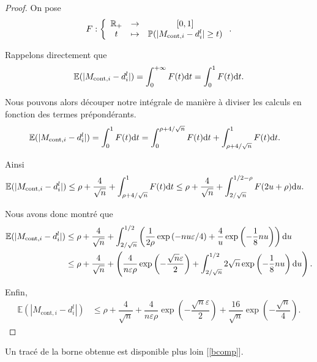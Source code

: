 \begin{proof}
    On pose 
    \[
        F : \left\{
            \begin{array}[]{ccc}
                \R_+ & \to & [0,1]\\
                t & \mapsto & \mathbb P(|M_{\text{cont}, i} - d_i^l| \geq t)
            \end{array}
        \right.   .
    \]

    Rappelons directement que
    \[
            \mathbb E(|M_{\text{cont}, i} - d_i^l|) = \int_0^{+\infty} F(t) \mathrm{d} t = \int_0^1 F(t) \mathrm{d} t.
    \]

    Nous pouvons alors découper notre intégrale de manière à diviser les calculs en fonction des termes prépondérants. 
    \begin{align*}
        \mathbb E(|M_{\text{cont}, i} - d_i^l|) & = \int_0^1 F(t) \mathrm{d} t = \int_0^{\rho + 4/\sqrt n} F(t) \mathrm{d} t + \int_{\rho + 4/\sqrt n}^1 F(t) \mathrm{d} t.
    \end{align*}

    Ainsi
    \begin{align*}
        \mathbb E(|M_{\text{cont}, i} - d_i^l|) & \leq \rho + \dfrac{4}{\sqrt n}  + \int_{\rho + 4/\sqrt n}^1 F(t) \mathrm{d} t \leq \rho + \dfrac{4}{\sqrt n}  + \int_{2/\sqrt n}^{1/2 - \rho} F(2u + \rho) \mathrm{d} u.
    \end{align*}

    Nous avons donc montré que
    \begin{align*}
        \mathbb E(|M_{\text{cont}, i} - d_i^l|) & \leq \rho + \dfrac{4}{\sqrt n}  + \int_{2/\sqrt n}^{1/2} \left( \dfrac{1}{2\rho}\exp\left( -{nu\varepsilon}/{4} \right) + \dfrac{4}{u}\exp\left( - \dfrac{1}{8}n u \right) \right) \mathrm{d} u\\
        & \leq \rho + \dfrac{4}{\sqrt n}  + \left( \dfrac{4}{n\varepsilon\rho}\exp\left( -\dfrac{\sqrt n \varepsilon}{2} \right) + \int_{2/\sqrt n}^{1/2} 2\sqrt n \exp\left( - \dfrac{1}{8}n u \right) \mathrm{d} u \right).
    \end{align*}

    Enfin, 
    \begin{align*}
        \mathbb E(|M_{\text{cont}, i} - d_i^l|) & \leq \rho + \dfrac{4}{\sqrt n} +\dfrac{4}{n\varepsilon\rho}\exp\left( -\dfrac{\sqrt n \varepsilon}{2} \right) + \dfrac{16}{\sqrt{n}}\exp\left( -\dfrac{\sqrt n }{4} \right).
    \end{align*}
\end{proof}

Un tracé de la borne obtenue est disponible plus loin [\ref{bcomp}].

